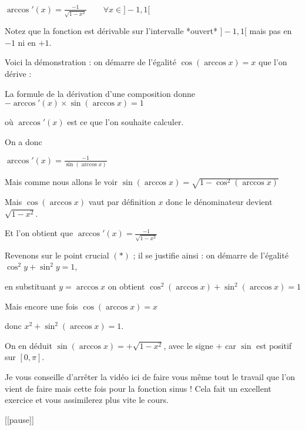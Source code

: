 $\arccos'(x) = \frac{-1}{\sqrt{1-x^2}} \qquad \forall x \in ]-1,1[$

Notez que la fonction est dérivable sur l'intervalle *ouvert* $]-1,1[$
mais pas en $-1$ ni en $+1$.

\change

Voici la démonstration : on démarre de l'égalité $\cos(\arccos x) = x$ que l'on dérive :


\change

La formule de la dérivation d'une composition donne
$-\arccos'(x) \times  \sin(\arccos x) = 1$

où $\arccos'(x)$ est ce que l'on souhaite calculer.

\change

On a donc 

$\arccos'(x) = \frac{-1}{\sin(\arccos x)}$

\change


Mais comme nous allons le voir $\sin(\arccos x) = \sqrt{1-\cos^2(\arccos x)}$

\change

Mais $\cos(\arccos x)$ vaut par définition $x$
donc le dénominateur devient $\sqrt{1-x^2}$.

Et l'on obtient que $\arccos'(x) = \frac{-1}{\sqrt{1-x^2}}$



\change

Revenons sur le point crucial $(*)$ ; il se justifie ainsi :
on démarre de l'égalité $\cos^2 y + \sin^2 y = 1$,  

\change

en substituant $y= \arccos x$ on obtient $\cos^2(\arccos x)+ \sin^2(\arccos x) = 1$

\change

Mais encore une fois $\cos(\arccos x)=x$

donc $x^2+ \sin^2(\arccos x) = 1$. 

\change

On en déduit  $\sin(\arccos x) = + \sqrt{1-x^2}$, avec le signe $+$ car $\sin $ est positif sur $[0,\pi]$.


\diapo

Je vous conseille d'arrêter la vidéo ici de faire vous même tout le travail que l'on vient
de faire mais cette fois pour la fonction sinus ! Cela fait un excellent exercice et
vous assimilerez plus vite le cours.

[[pause]]

\change

